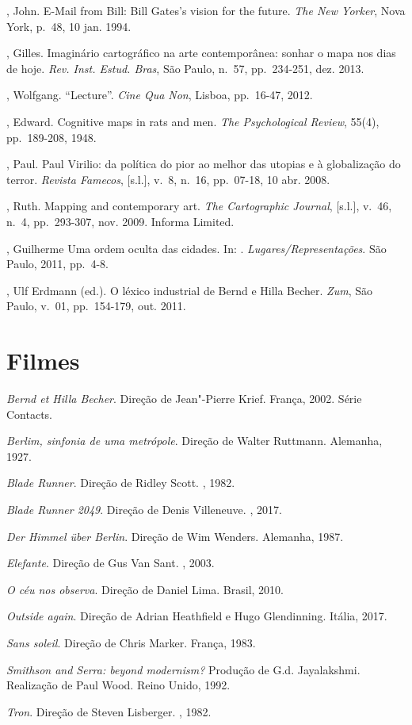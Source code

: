\begin{Parskip}
, John. E-Mail from Bill: Bill Gates's vision for the future.
\emph{The New Yorker}, Nova York, p.~48, 10 jan. 1994.

, Gilles. Imaginário cartográfico na arte contemporânea:
sonhar o mapa nos dias de hoje. \emph{Rev. Inst. Estud. Bras}, São
Paulo, n.~57, pp.~234-251, dez. 2013.

, Wolfgang. ``Lecture''. \emph{Cine Qua Non}, Lisboa, pp.~16-47,
2012.

, Edward. Cognitive maps in rats and men. \emph{The Psychological Review}, 55(4), pp.~189-208, 1948.

, Paul. Paul Virilio: da política do pior ao melhor das utopias e
à globalização do terror. \emph{Revista Famecos}, {[}s.l.{]}, v.~8, n.~16, pp.~07-18, 10 abr. 2008.

, Ruth. Mapping and contemporary art. \emph{The Cartographic
Journal}, {[}s.l.{]}, v.~46, n.~4, pp.~293-307, nov. 2009. Informa 
Limited.

, Guilherme Uma ordem oculta das cidades. In: .
\emph{Lugares/Representações}. São Paulo, 2011, pp.~4-8.

, Ulf Erdmann (ed.). O léxico industrial de Bernd e Hilla Becher.
\emph{Zum}, São Paulo, v.~01, pp.~154-179, out. 2011.
\end{Parskip}

\pagebreak

\section{Filmes}

\begin{Parskip}
\emph{Bernd et Hilla Becher}. Direção de Jean"-Pierre Krief. França, 2002. Série
Contacts.

\emph{Berlim, sinfonia de uma metrópole}. Direção de Walter Ruttmann. Alemanha,
1927.

\emph{Blade Runner}. Direção de Ridley Scott. , 1982.

\emph{Blade Runner 2049}. Direção de Denis Villeneuve. , 2017.

\emph{Der Himmel über Berlin}. Direção de Wim Wenders. Alemanha, 1987.

\emph{Elefante}. Direção de Gus Van Sant. , 2003.

\emph{O céu nos observa}. Direção de Daniel Lima. Brasil, 2010. %

\emph{Outside again}. Direção de Adrian Heathfield e Hugo Glendinning. Itália, 2017.

\emph{Sans soleil}. Direção de Chris Marker. França, 1983.

\emph{Smithson and Serra: beyond modernism?} Produção de G.d. Jayalakshmi.
Realização de Paul Wood. Reino Unido, 1992.

\emph{Tron}. Direção de Steven Lisberger. , 1982.
\end{Parskip}